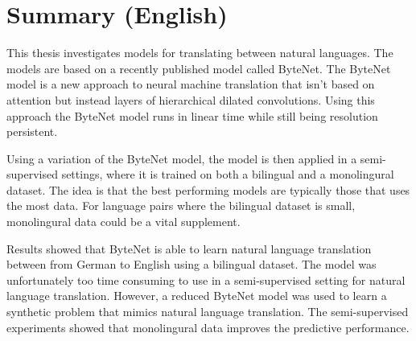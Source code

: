 \chapter{Summary (English)}

This thesis investigates models for translating between natural languages. The models are based on a recently published model called ByteNet. The ByteNet model is a new approach to neural machine translation that isn't based on attention but instead layers of hierarchical dilated convolutions. Using this approach the ByteNet model runs in linear time while still being resolution persistent.

Using a variation of the ByteNet model, the model is then applied in a semi-supervised settings, where it is trained on both a bilingual and a monolingural dataset. The idea is that the best performing models are typically those that uses the most data. For language pairs where the bilingual dataset is small, monolingural data could be a vital supplement.

Results showed that ByteNet is able to learn natural language translation between from German to English using a bilingual dataset. The model was unfortunately too time consuming to use in a semi-supervised setting for natural language translation. However, a reduced ByteNet model was used to learn a synthetic problem that mimics natural language translation. The semi-supervised experiments showed that monolingural data improves the predictive performance.
